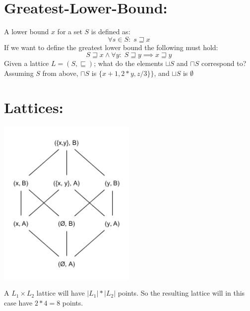 \documentclass{article}
\begin{document}
\section*{Greatest-Lower-Bound:}
A lower bound $x$ for a set $S$ is defined as:
$$\forall s \in S:\;s \sqsupseteq x$$
If we want to define the greatest lower bound the following must hold:
$$S\sqsupseteq x \land \forall y:\;S\sqsupseteq y \implies x \sqsupseteq y$$
Given a lattice $L = (S, \sqsubseteq)$; what do the elements $\sqcup S$ and $\sqcap S$ correspond to? Assuming $S$ from above, $\sqcap S$ is $\{x+1, 2*y, z/3\}\}$, and $\sqcup S$ is $\emptyset$
\section*{Lattices:}
\includegraphics[width=0.5\textwidth]{Lattices}

\noindent A $L_1 \times L_2$ lattice will have $|L_1| * |L_2|$ points. So the resulting lattice will in this case have $2 * 4 = 8$ points.
\end{document}
